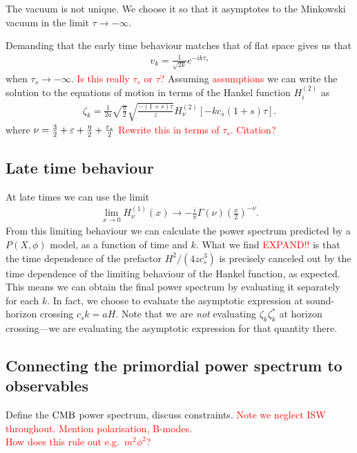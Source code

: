     The vacuum is not unique. We choose it so that it
    asymptotes to the Minkowski vacuum in the limit $\tau\to-\infty$.

    Demanding that the early time behaviour matches that of flat space
    gives us that
    \begin{align}
        v_k = \frac{1}{\sqrt{2k}}e^{-ik\tau_s}
    \end{align}
    when $\tau_s\rightarrow -\infty$.
    \textcolor{red}{Is this really $\tau_s$ or $\tau$?}
    Assuming \textcolor{red}{assumptions} we can write the solution to the equations
    of motion in terms of the Hankel function $H^{(2)}_i$ as~\cite{px_burrage}
    \begin{align}
        \zeta_k = \frac{1}{2a}\sqrt{\frac{\pi}{2}}\sqrt{\frac{-(1+s)\tau}{z}}H^{(2)}_{\nu}\left[-kc_s(1+s)\tau\right].
    \end{align}
    where $\nu = \frac{3}{2}+\varepsilon+\frac{\eta}{2}+\frac{\varepsilon_{s}}{2}$
    \textcolor{red}{Rewrite this in terms of $\tau_s$. Citation?}

    \subsection{Late time behaviour}
    At late times we can use the limit
    \begin{align}
        \lim_{x\rightarrow 0}H^{(1)}_\nu(x)\rightarrow-\frac{i}{\pi}\Gamma(\nu)\left(\frac{x}{2}\right)^{-\nu}.
    \end{align}
    From this limiting behaviour we can calculate the power spectrum predicted by
    a $P(X,\phi)$ model, as a function of time and $k$.
    What we find \textcolor{red}{EXPAND!!} is that the time dependence
    of the prefactor $H^2/(4zc_s^3)$ is precisely canceled out by the time dependence
    of the limiting behaviour of the Hankel function, as expected.
    This means we can obtain the final power spectrum by evaluating
    it separately for each $k$. In fact, we choose to evaluate the asymptotic expression
    at sound-horizon crossing $c_sk=aH$. Note that we are \textit{not} evaluating
    $\zeta_k\zeta^*_k$ at horizon crossing---we are evaluating the asymptotic expression
    for that quantity there.


    \subsection{Connecting the primordial power spectrum to observables}
    Define the $\text{CMB}$ power spectrum, discuss constraints.
    \textcolor{red}{Note we neglect ISW throughout. Mention polarisation, B-modes.\\
    How does this rule out e.g.\ $m^2\phi^2$?}


